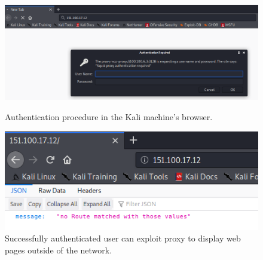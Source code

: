 \begin{figure}[!htb]
\centering
\begin{minipage}{.5\textwidth}
  \centering
  \includegraphics[width=1\textwidth]{proxyAuth.png}
  \caption[a]{Authentication procedure in the Kali machine's browser.}\label{fig:9}
\end{minipage}%
\begin{minipage}{.5\textwidth}
  \centering
  \includegraphics[width=1\textwidth]{proxyAuthed.png}
  \caption[a]{Successfully authenticated user can exploit proxy to display web pages outside of the network.}\label{fig:10}
\end{minipage}%
\end{figure}
